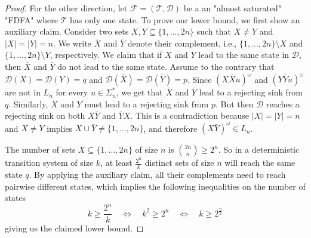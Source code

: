 \documentclass[a4paper,USenglish,cleveref,autoref,thm-restate]{lipics-v2021}
\newcommand{\mc}[1]{\ensuremath{\mathcal{#1}}}
\newcommand{\T}{\mc{T}}
\newcommand{\F}{\mc{F}}
\newcommand{\D}{\mc{D}}
\begin{document}
{\begin{proof}
  For the other direction, let $\F = (\T, \D)$ be a an "almost saturated" "FDFA" where $\T$ has only one state.
  To prove our lower bound, we first show an auxiliary claim.
  Consider two sets $X, Y \subseteq \{1,\dots,2n\}$ such that $X \not= Y$ and $|X| =|Y| = n$.
  We write $\bar{X}$ and $\bar{Y}$ denote their complement, i.e., $\{1,\dots,2n\}\setminus X$ and $\{1,\dots,2n\}\setminus Y$, respectively.
  We claim that if $X$ and $Y$ lead to the same state in $\D$, then $\bar{X}$ and $\bar{Y}$ do not lead to the same state.
  Assume to the contrary that $\D(X) = \D(Y) = q$ and $\D(\bar{X}) = \D(\bar{Y}) = p$.
  Since $(X\bar{X}u)^\omega$ and $(Y\bar{Y}u)^\omega$ are not in $L_n$ for every $u \in \Sigma_n^*$, we get that $\bar{X}$ and $\bar{Y}$ lead to a rejecting sink from $q$.
  Similarly, $X$ and $Y$ must lead to a rejecting sink from $p$.
  But then $\D$ reaches a rejecting sink on both $X\bar{Y}$ and $\bar{Y}X$.
  This is a contradiction because $|X| = |Y| = n$ and $X \not= Y$ implies $X \cup \bar{Y} \not= \{1, \ldots, 2n\}$, and therefore $(X\bar{Y})^\omega \in L_n$.

  The number of sets $X \subseteq \{1,\dotsc,2n\}$ of size $n$ is ${\binom{2n}{n}} \geq 2^n$.
  So in a deterministic transition system of size $k$, at least $\frac{2^n}{k}$ distinct sets of size $n$ will reach the same state $q$.  By applying the auxiliary claim, all their complements need to reach pairwise different states, which implies the following inequalities on the number of states
  \[
    k \geq \frac{2^n}{k} \quad \iff \quad k^2 \geq 2^n \quad \iff \quad k \geq 2^{\frac n 2}
  \]
  giving us the claimed lower bound.
\end{proof}

}
\end{document}
